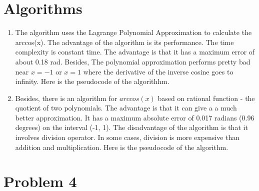 \documentclass[10pt]{article}
\newcommand{\TITLE}[1]{\item[#1]}
\begin{document}
\section{Algorithms}
\begin{enumerate}
    \item The algorithm uses the Lagrange Polynomial Approximation to calculate the arccos(x). The advantage of the algorithm is its performance. The time complexity is constant time. The advantage is that it has a maximum error of about 0.18 rad. Besides, The polynomial approximation performs pretty bad near $x=-1$ or $x=1$ where the derivative of the inverse cosine goes to infinity. Here is the pseudocode of the algorithhm. \newline
    

    \item Besides, there is an algorithm for $arccos(x)$ based on rational function - the quotient of two polynomials. The advantage is that it can give a a much better approximation. It has a maximum absolute error of 0.017 radians (0.96 degrees) on the interval (-1, 1). The disadvantage of the algorithm is that it involves division operator. In some cases, division is more expensive than addition and multiplication. Here is the pseudocode of the algorithm. \newline
    
\end{enumerate}

\pagebreak
\section{Problem 4}
\end{document}
